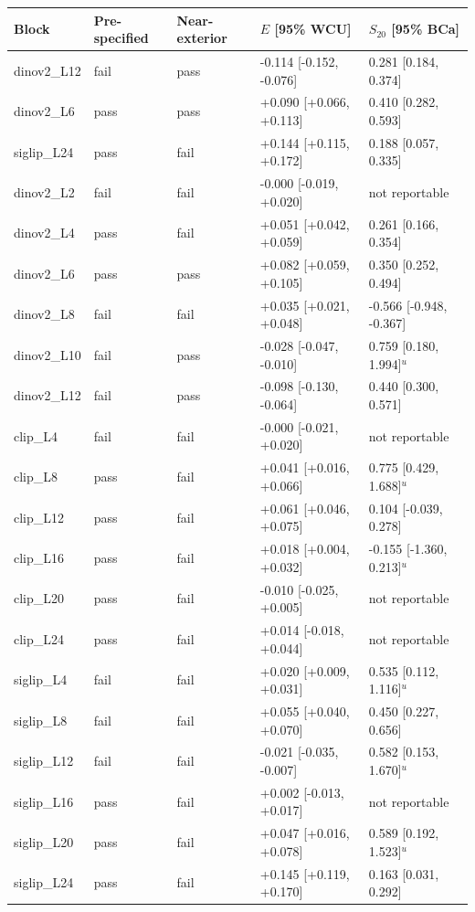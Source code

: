 \begin{tabular}{lllll}
\hline
Block & Pre-specified & Near-exterior & $E$ [95\% WCU] & $S_{20}$ [95\% BCa] \\
\hline
dinov2\_L12 & fail & pass & -0.114 [-0.152, -0.076] & 0.281 [0.184, 0.374] \\
dinov2\_L6 & pass & pass & +0.090 [+0.066, +0.113] & 0.410 [0.282, 0.593] \\
siglip\_L24 & pass & fail & +0.144 [+0.115, +0.172] & 0.188 [0.057, 0.335] \\
dinov2\_L2 & fail & fail & -0.000 [-0.019, +0.020] & not reportable \\
dinov2\_L4 & pass & fail & +0.051 [+0.042, +0.059] & 0.261 [0.166, 0.354] \\
dinov2\_L6 & pass & pass & +0.082 [+0.059, +0.105] & 0.350 [0.252, 0.494] \\
dinov2\_L8 & fail & fail & +0.035 [+0.021, +0.048] & -0.566 [-0.948, -0.367] \\
dinov2\_L10 & fail & pass & -0.028 [-0.047, -0.010] & 0.759 [0.180, 1.994]$^u$ \\
dinov2\_L12 & fail & pass & -0.098 [-0.130, -0.064] & 0.440 [0.300, 0.571] \\
clip\_L4 & fail & fail & -0.000 [-0.021, +0.020] & not reportable \\
clip\_L8 & pass & fail & +0.041 [+0.016, +0.066] & 0.775 [0.429, 1.688]$^u$ \\
clip\_L12 & pass & fail & +0.061 [+0.046, +0.075] & 0.104 [-0.039, 0.278] \\
clip\_L16 & pass & fail & +0.018 [+0.004, +0.032] & -0.155 [-1.360, 0.213]$^u$ \\
clip\_L20 & pass & fail & -0.010 [-0.025, +0.005] & not reportable \\
clip\_L24 & pass & fail & +0.014 [-0.018, +0.044] & not reportable \\
siglip\_L4 & fail & fail & +0.020 [+0.009, +0.031] & 0.535 [0.112, 1.116]$^u$ \\
siglip\_L8 & fail & fail & +0.055 [+0.040, +0.070] & 0.450 [0.227, 0.656] \\
siglip\_L12 & fail & fail & -0.021 [-0.035, -0.007] & 0.582 [0.153, 1.670]$^u$ \\
siglip\_L16 & pass & fail & +0.002 [-0.013, +0.017] & not reportable \\
siglip\_L20 & pass & fail & +0.047 [+0.016, +0.078] & 0.589 [0.192, 1.523]$^u$ \\
siglip\_L24 & pass & fail & +0.145 [+0.119, +0.170] & 0.163 [0.031, 0.292] \\
\hline
\end{tabular}
